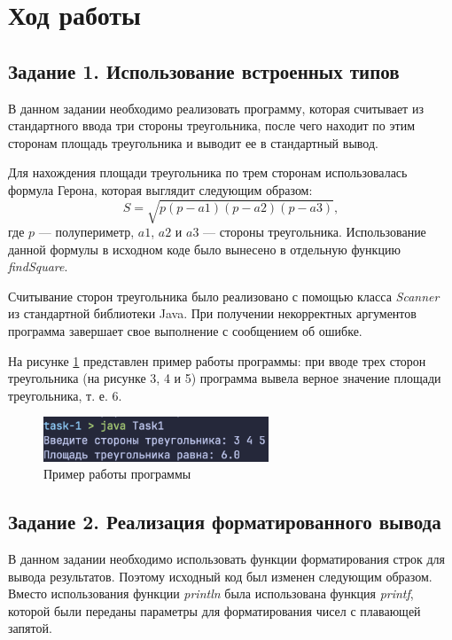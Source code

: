 \documentclass[a4paper, 14pt]{extarticle}
\begin{document}
\section*{Ход работы}

\subsection*{Задание 1. Использование встроенных типов}

В данном задании необходимо реализовать программу, которая считывает из
стандартного ввода три стороны треугольника, после чего находит по этим сторонам
площадь треугольника и выводит ее в стандартный вывод.

Для нахождения площади треугольника по трем сторонам использовалась формула
Герона, которая выглядит следующим образом:
\[
  S = \sqrt{p (p - a1) (p - a2) (p - a3)},
\]
где \(p\) --- полупериметр, \(a1\), \(a2\) и \(a3\) --- стороны треугольника.
Использование данной формулы в исходном коде было вынесено в отдельную функцию
\textit{findSquare}.

Считывание сторон треугольника было реализовано с помощью класса
\textit{Scanner} из стандартной библиотеки Java. При получении некорректных
аргументов программа завершает свое выполнение с сообщением об ошибке.

На рисунке \ref{fig:task-1} представлен пример работы программы: при вводе трех
сторон треугольника (на рисунке 3, 4 и 5) программа вывела верное значение
площади треугольника, т. е. 6.

\begin{figure}[H]
  \centering
  \includegraphics[width=0.6\textwidth]{images/task-1.png}
  \caption{Пример работы программы}
  \label{fig:task-1}
\end{figure}

\subsection*{Задание 2. Реализация форматированного вывода}

В данном задании необходимо использовать функции форматирования строк для вывода
результатов. Поэтому исходный код был изменен следующим образом. Вместо
использования функции \textit{println} была использована функция
\textit{printf}, которой были переданы параметры для форматирования чисел с
плавающей запятой.
\end{document}
